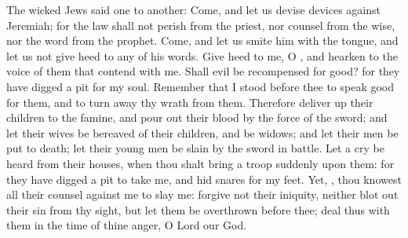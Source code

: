 \vspace{-0.4\baselineskip}


\vspace{-0.1\baselineskip}

 The wicked Jews said one to another: Come, and let us devise devices against Jeremiah; for the law shall not perish from the priest, nor counsel from the wise, nor the word from the prophet. Come, and let us smite him with the tongue, and let us not give heed to any of his words. Give heed to me, O , and hearken to the voice of them that contend with me. Shall evil be recompensed for good? for they have digged a pit for my soul. Remember that I stood before thee to speak good for them, and to turn away thy wrath from them. Therefore deliver up their children to the famine, and pour out their blood by the force of the sword; and let their wives be bereaved of their children, and be widows; and let their men be put to death; let their young men be slain by the sword in battle. Let a cry be heard from their houses, when thou shalt bring a troop suddenly upon them: for they have digged a pit to take me, and hid snares for my feet. Yet, , thou knowest all their counsel against me to slay me: forgive not their iniquity, neither blot out their sin from thy sight, but let them be overthrown before thee; deal thus with them in the time of thine anger, O Lord our God.



\vspace{-0.5\baselineskip}

